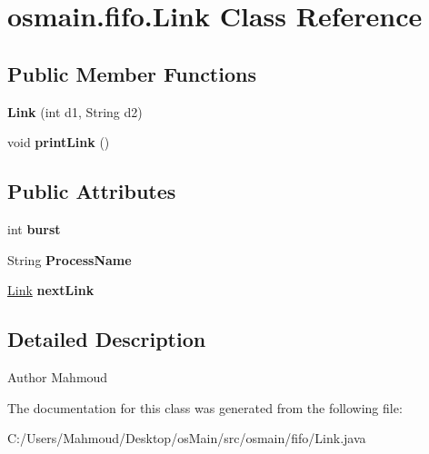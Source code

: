 \hypertarget{classosmain_1_1fifo_1_1_link}{}\section{osmain.\+fifo.\+Link Class Reference}
\label{classosmain_1_1fifo_1_1_link}
\subsection*{Public Member Functions}
\begin{DoxyCompactItemize}
\item 
{\bfseries Link} (int d1, String d2)\hypertarget{classosmain_1_1fifo_1_1_link_a01648e1a268a42f1bbd72f942beee8be}{}\label{classosmain_1_1fifo_1_1_link_a01648e1a268a42f1bbd72f942beee8be}

\item 
void {\bfseries print\+Link} ()\hypertarget{classosmain_1_1fifo_1_1_link_acd403ee52b40cc44682e9e72f0191f07}{}\label{classosmain_1_1fifo_1_1_link_acd403ee52b40cc44682e9e72f0191f07}

\end{DoxyCompactItemize}
\subsection*{Public Attributes}
\begin{DoxyCompactItemize}
\item 
int {\bfseries burst}\hypertarget{classosmain_1_1fifo_1_1_link_aa87ffa1ef21b67bdf3fed8e28db4ea99}{}\label{classosmain_1_1fifo_1_1_link_aa87ffa1ef21b67bdf3fed8e28db4ea99}

\item 
String {\bfseries Process\+Name}\hypertarget{classosmain_1_1fifo_1_1_link_a328bb7551a5abe77898815d136493c36}{}\label{classosmain_1_1fifo_1_1_link_a328bb7551a5abe77898815d136493c36}

\item 
\hyperlink{classosmain_1_1fifo_1_1_link}{Link} {\bfseries next\+Link}\hypertarget{classosmain_1_1fifo_1_1_link_ae12a933f58852b82b8515ed6c28f588a}{}\label{classosmain_1_1fifo_1_1_link_ae12a933f58852b82b8515ed6c28f588a}

\end{DoxyCompactItemize}


\subsection{Detailed Description}
\begin{DoxyAuthor}{Author}
Mahmoud 
\end{DoxyAuthor}


The documentation for this class was generated from the following file\+:\begin{DoxyCompactItemize}
\item 
C\+:/\+Users/\+Mahmoud/\+Desktop/os\+Main/src/osmain/fifo/Link.\+java\end{DoxyCompactItemize}
